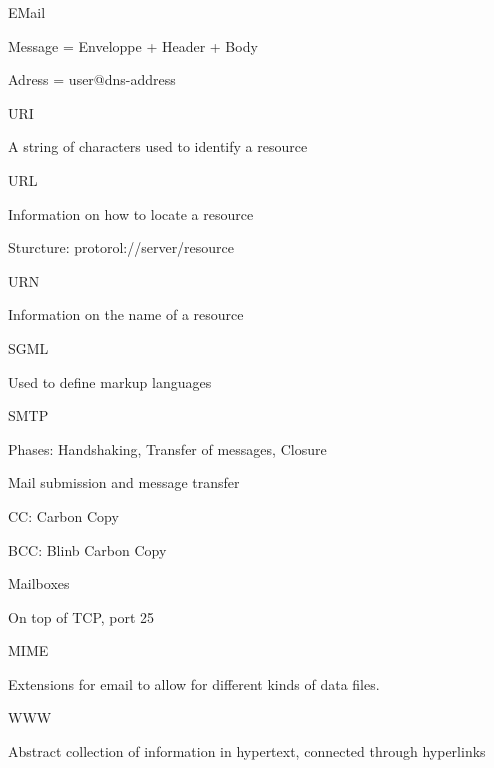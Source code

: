 \documentclass[main.tex]{subfiles}
\begin{document}
\begin{card}{EMail}
\item Message = Enveloppe + Header + Body
\item Adress = user@dns-address
\end{card}

\begin{card}{URI}
\item A string of characters used to identify a resource
\end{card}

\begin{card}{URL}
\item Information on how to locate a resource
\item Sturcture: protorol://server/resource
\end{card}

\begin{card}{URN}
\item Information on the name of a resource
\end{card}

\begin{card}{SGML}
\item Used to define markup languages
\end{card}

\begin{card}{SMTP}
\item Phases: Handshaking, Transfer  of  messages, Closure
\item Mail submission and message transfer
\item CC: Carbon Copy
\item BCC: Blinb Carbon Copy
\item Mailboxes
\item On top of TCP, port 25
\end{card}

\begin{card}{MIME}
\item Extensions for email to allow for different kinds of data files.
\end{card}

\begin{card}{WWW}
\item Abstract collection of information in hypertext, connected through hyperlinks
\end{card}
\end{document}

